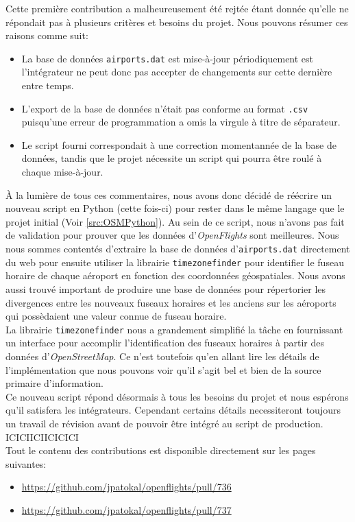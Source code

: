 Cette première contribution a malheureusement été rejtée étant donnée qu'elle ne répondait pas à plusieurs critères et besoins du projet. Nous pouvons résumer ces raisons comme suit: \\
\begin{itemize}
	\item La base de données \texttt{airports.dat} est mise-à-jour périodiquement est l'intégrateur ne peut donc pas accepter de changements sur cette dernière entre temps.
	\item L'export de la base de données n'était pas conforme au format \texttt{.csv} puisqu'une erreur de programmation a omis la virgule à titre de séparateur.
	\item Le script fourni correspondait à une correction momentannée de la base de données, tandis que le projet nécessite un script qui pourra être roulé à chaque mise-à-jour.
\end{itemize}
\vspace{\baselineskip}

À la lumière de tous ces commentaires, nous avons donc décidé de réécrire un nouveau script en Python (cette fois-ci) pour rester dans le même langage que le projet initial (Voir \autoref{src:OSMPython}). Au sein de ce script, nous n'avons pas fait de validation pour prouver que les données d'\emph{OpenFlights} sont meilleures. Nous nous sommes contentés d'extraire la base de données d'\texttt{airports.dat} directement du web pour ensuite utiliser la librairie \texttt{timezonefinder} pour identifier le fuseau horaire de chaque aéroport en fonction des coordonnées géospatiales. Nous avons aussi trouvé important de produire une base de données pour répertorier les divergences entre les nouveaux fuseaux horaires et les anciens sur les aéroports qui possèdaient une valeur connue de fuseau horaire. \\

La librairie \texttt{timezonefinder} nous a grandement simplifié la tâche en fournissant un interface pour accomplir l'identification des fuseaux horaires à partir des données d'\emph{OpenStreetMap}. Ce n'est toutefois qu'en allant lire les détails de l'implémentation que nous pouvons voir qu'il s'agit bel et bien de la source primaire d'information. \cite{timezonefinder} \\

Ce nouveau script répond désormais à tous les besoins du projet et nous espérons qu'il satisfera les intégrateurs. Cependant certains détails necessiteront toujours un travail de révision avant de pouvoir être intégré au script de production. ICICIICIICICICI \\

Tout le contenu des contributions est disponible directement sur les pages suivantes: 
\begin{itemize}
	\item \url{https://github.com/jpatokal/openflights/pull/736} \\
	\item \url{https://github.com/jpatokal/openflights/pull/737}
\end{itemize}